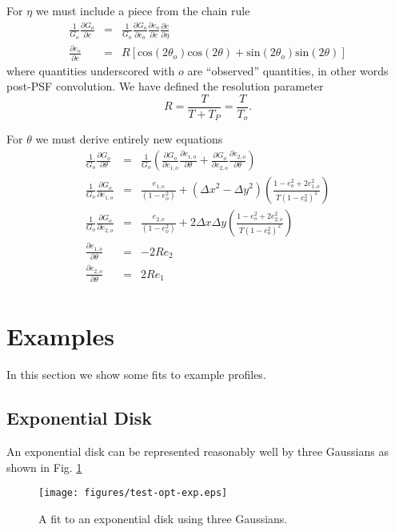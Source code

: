 \documentclass[12pt,preprint]{aastex}
\newcommand{\Dx}{\ensuremath{\Delta x}}
\newcommand{\Dy}{\ensuremath{\Delta y}}
\begin{document}
For $\eta$ we must include a piece from the chain rule
\begin{eqnarray}
\frac{1}{G_o} \frac{\partial G_o}{\partial e} 
 & = & \frac{1}{G_o} \frac{\partial G_o}{\partial e_o} \frac{\partial e_o}{\partial e} \frac{\partial e}{\partial \eta} \\
\frac{\partial e_o}{\partial e} 
 & = & R \left[ \mathrm{cos}(2\theta_o)\mathrm{cos}(2\theta)
               +\mathrm{sin}(2\theta_o)\mathrm{sin}(2\theta) \right]
\end{eqnarray}
where quantities underscored with $o$ are ``observed'' quantities, in 
other words post-PSF convolution.  We have defined the resolution 
parameter 
\begin{equation}
R = \frac{T}{T + T_P} = \frac{T}{T_o}.
\end{equation}

For $\theta$ we must derive entirely new equations
\begin{eqnarray}
\frac{1}{G_o} \frac{\partial G_o}{\partial \theta} 
 & = & \frac{1}{G_o} \left( 
   \frac{\partial G_o}{\partial e_{1,o}} \frac{\partial e_{1,o}}{\partial \theta}
   + \frac{\partial G_o}{\partial e_{2,o}} \frac{\partial e_{2,o}}{\partial \theta}
                     \right) \\
\frac{1}{G_o} \frac{\partial G_o}{\partial e_{1,o}} 
   & = & \frac{e_{1,o}}{(1-e_o^2)} + (\Dx^2 - \Dy^2) \left(\frac{1-e_o^2 + 2 e_{1,o}^2}{T (1-e_o^2)^2}\right)\\
\frac{1}{G_o} \frac{\partial G_o}{\partial e_{2,o}} 
   & = & \frac{e_{2,o}}{(1-e_o^2)} + 2 \Dx \Dy \left(\frac{1-e_o^2 + 2 e_{2,o}^2}{T (1-e_o^2)^2}\right)\\
\frac{\partial e_{1,o}}{\partial \theta} & = & -2 R e_2 \\
\frac{\partial e_{2,o}}{\partial \theta} & = & 2 R e_1 \\
\end{eqnarray}

\section{Examples}

In this section we show some fits to example profiles.

\subsection{Exponential Disk}

An exponential disk can be represented reasonably well by three Gaussians
as shown in Fig. \ref{fig:expcmp}

\begin{figure}[t] \centering
 \centering 
 \texttt{[image: figures/test-opt-exp.eps]}

 \caption{A fit to an exponential disk using three Gaussians.}
 \label{fig:expcmp}

\end{figure}
\end{document}
